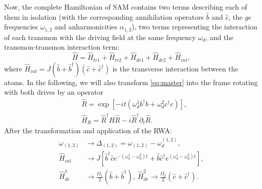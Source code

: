 \documentclass[%
 aip,
 amsmath,amssymb,
 reprint,%
]{revtex4-1}
\begin{document}
Now, the complete Hamiltonian of SAM contains two terms describing each of them in isolation (with the corresponding annihilation operators $\hat b$ and $\hat c$, the $ge$ frequencies $\omega_{1,2}$ and anharmonicities $\alpha_{1,2}$), two terms representing the interaction of each transmon with the driving field at the same frequency $\omega_d$, and the transmon-transmon interaction term:
\begin{equation}\label{Hsystem}
\hat H = \hat H_{tr1}+\hat H_{tr2}+\hat H_{dr1}+\hat H_{dr2}+\hat H_{int},
\end{equation}
where $\hat H_{int} = J (\hat b +\hat b^\dag)(\hat c+\hat c^{\dagger})$ is the transverse interaction between the atoms. In the following, we will also transform \eqref{eq:master} into the frame rotating with both drives by an operator
\begin{align}
&\hat R = \exp[-i t (\omega_d^1 b^{\dagger}b+\omega_d^2 c^{\dagger}c)],\label{eq:R}\\
&\hat H_R = \hat R^{\dagger}\hat H \hat R - i\hat R^{\dagger}\partial_t \hat R.\label{eq:rotation}
\end{align}
After the transformation and application of the RWA:
\begin{equation}
\begin{aligned}
	\omega_{(1,2)} &\rightarrow \Delta_{(1,2)} = \omega_{(1,2)} - \omega_d^{(1,2)},\\
	\hat H_{int} &\rightarrow J \left[\hat b^\dag \hat c e^{-(\omega_d^1 - \omega_d^2)t} + \hat b \hat c^\dag e^{(\omega_d^1 - \omega_d^2)t}\right],\\
	\hat H_{dr}^1 &\rightarrow \frac{\Omega_1}{2}(\hat b  + \hat b^\dag),\ 	\hat H_{dr}^2 \rightarrow \frac{\Omega_2}{2}(\hat c  + \hat c^\dag).
\end{aligned}
\label{eq:RWA}
\end{equation}
\end{document}
